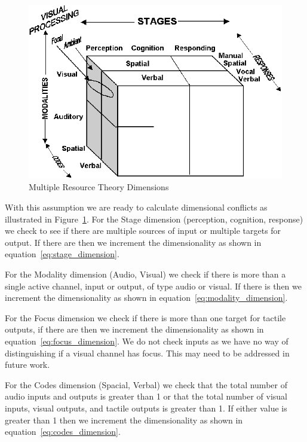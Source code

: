 \begin{figure}[h]
\begin{center}
\includegraphics[width=6in]{multresourcetheory.png}
\caption{Multiple Resource Theory Dimensions}
\label{fig:multipleresourcetheory}
\end{center}
\end{figure}

With this assumption we are ready to calculate dimensional conflicts as illustrated in Figure~\ref{fig:multipleresourcetheory}.
For the Stage dimension (perception, cognition, response) we check to see if there are multiple sources of input or multiple targets for output.  If there are then we increment the dimensionality as shown in equation~\ref{eq:stage_dimension}.  

For the Modality dimension (Audio, Visual) we check if there is more than a single active channel, input or output, of type audio or visual.  If there is then we increment the dimensionality as shown in equation~\ref{eq:modality_dimension}.

For the Focus dimension we check if there is more than one target for tactile outputs, if there are then we increment the dimensionality as shown in equation~\ref{eq:focus_dimension}.  We do not check inputs as we have no way of distinguishing if a visual channel has focus.  This may need to be addressed in future work. 

For the Codes dimension (Spacial, Verbal) we check that the total number of audio inputs and outputs is greater than 1 or that the total number of visual inputs, visual outputs, and tactile outputs is greater than 1.  If either value is greater than 1 then we increment the dimensionality as shown in equation~\ref{eq:codes_dimension}.


